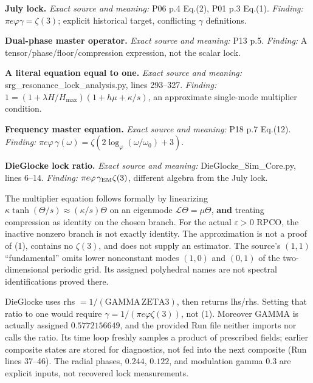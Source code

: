 \documentclass[11pt,a4paper]{article}
\begin{document}
\par\smallskip\noindent\textbf{July lock.} 
\textit{Exact source and meaning:} P06 p.4 Eq.(2), P01 p.3 Eq.(1). \textit{Finding:} $\pi e\varphi\gamma=\zeta(3)$; explicit historical target, conflicting $\gamma$ definitions.
\par\smallskip\noindent\textbf{Dual-phase master operator.} 
\textit{Exact source and meaning:} P13 p.5. \textit{Finding:} A tensor/phase/floor/compression expression, not the scalar lock.
\par\smallskip\noindent\textbf{A literal equation equal to one.} 
\textit{Exact source and meaning:} srg\_\allowbreak{}resonance\_\allowbreak{}lock\_\allowbreak{}analysis.py, lines 293--327. \textit{Finding:} $1=(1+\lambda H/H_{\max})(1+h\mu+\kappa/s)$, an approximate single-mode multiplier condition.
\par\smallskip\noindent\textbf{Frequency master equation.} 
\textit{Exact source and meaning:} P18 p.7 Eq.(12). \textit{Finding:} $\pi e\varphi\,\gamma(\omega)=\zeta(2\log_\varphi(\omega/\omega_0)+3)$.
\par\smallskip\noindent\textbf{DieGlocke lock ratio.} 
\textit{Exact source and meaning:} DieGlocke\_\allowbreak{}Sim\_\allowbreak{}Core.py, lines 6--14. \textit{Finding:} $\pi e\varphi\,\gamma_{\rm EM}\zeta(3)$, different algebra from the July lock.

The multiplier equation follows formally by linearizing $\kappa\tanh(\Theta/s)\approx(\kappa/s)\Theta$ on an eigenmode $\mathcal L\Theta=\mu\Theta$, \textbf{and} treating compression as identity on the chosen branch. For the actual $\varepsilon>0$ RPCO, the inactive nonzero branch is not exactly identity. The approximation is not a proof of (1), contains no $\zeta(3)$, and does not supply an estimator. The source's $(1,1)$ ``fundamental'' omits lower nonconstant modes $(1,0)$ and $(0,1)$ of the two-dimensional periodic grid. Its assigned polyhedral names are not spectral identifications proved there.


DieGlocke uses rhs $=1/(\mathrm{GAMMA}\,\mathrm{ZETA3})$, then returns lhs/rhs. Setting that ratio to one would require $\gamma=1/(\pi e\varphi\zeta(3))$, not (1). Moreover GAMMA is actually assigned $0.5772156649$, and the provided Run file neither imports nor calls the ratio. Its time loop freshly samples a product of prescribed fields; earlier composite states are stored for diagnostics, not fed into the next composite (Run lines 37--46). The radial phases, $0.244$, $0.122$, and modulation gamma $0.3$ are explicit inputs, not recovered lock measurements.
\end{document}
